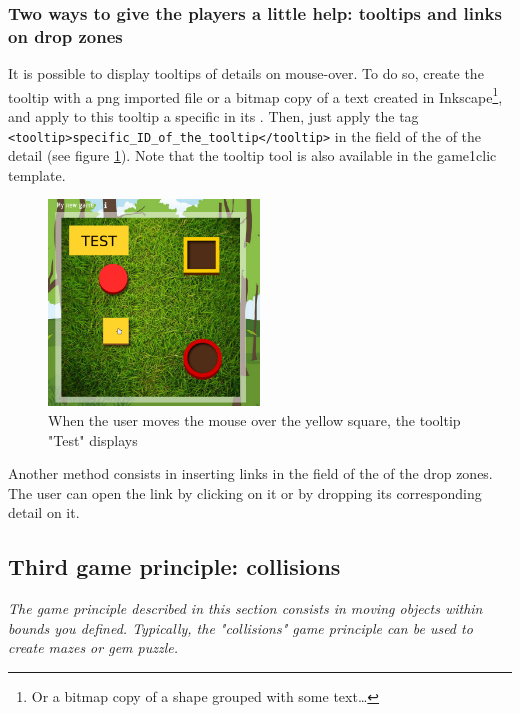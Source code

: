 \subsubsection{Two ways to give the players a little help: tooltips and links on drop zones}

It is possible to display tooltips of details on mouse-over. To do so, 
create the tooltip with a png imported file or a bitmap copy of a text created in 
Inkscape\footnote{Or a bitmap copy of a shape grouped with some text\ldots}, and 
apply to this tooltip a specific  in its . Then, 
just apply the tag \verb|<tooltip>specific_ID_of_the_tooltip</tooltip>| in the 
 field of the  of the detail (see figure \ref{tooltip_example}).
Note that the tooltip tool is also available in the game1clic template.

\begin{figure}[htp]
 \centering
 \includegraphics[width=0.5\textwidth]{images/tooltip_example}
 \caption[Tooltip]{When the user moves the mouse over the yellow square, the tooltip "Test" displays}
 \label{tooltip_example}
\end{figure}

Another method consists in inserting links in the  field of the  
of the drop zones. The user can open the link by clicking on it or by dropping its corresponding detail on it.

\subsection{Third game principle: collisions}

\textit{The game principle described in this section consists in moving objects
within bounds you defined. Typically, the "collisions" game principle
can be used to create mazes or gem puzzle.}

